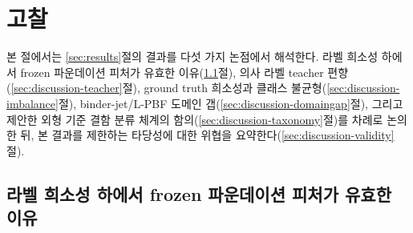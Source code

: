\section{고찰}
\label{sec:discussion}

본 절에서는 \ref{sec:results}절의 결과를 다섯 가지 논점에서 해석한다. 라벨
희소성 하에서 frozen 파운데이션 피처가 유효한
이유(\ref{sec:discussion-frozen}절), 의사 라벨 teacher
편향(\ref{sec:discussion-teacher}절), ground truth 희소성과 클래스
불균형(\ref{sec:discussion-imbalance}절), binder-jet/L-PBF 도메인
갭(\ref{sec:discussion-domaingap}절), 그리고 제안한 외형 기준 결함 분류
체계의 함의(\ref{sec:discussion-taxonomy}절)를 차례로 논의한 뒤, 본 결과를
제한하는 타당성에 대한 위협을 요약한다(\ref{sec:discussion-validity}절).

\subsection{라벨 희소성 하에서 frozen 파운데이션 피처가 유효한 이유}
\label{sec:discussion-frozen}

